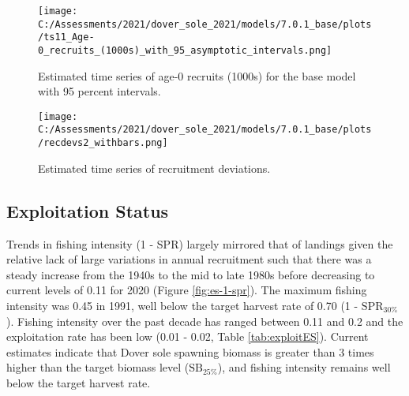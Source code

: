\documentclass[11pt,
  english,
  a4paper,
]{article}
\begin{document}
\leavevmode\tagmcend\tagstructend\par




\begin{figure}
\centering
\texttt{[image: C:/Assessments/2021/dover\_sole\_2021/models/7.0.1\_base/plots/ts11\_Age-0\_recruits\_(1000s)\_with\_95\_asymptotic\_intervals.png]}
\caption{Estimated time series of age-0 recruits (1000s) for the base model with 95 percent intervals.\label{fig:es-recruits}}
\end{figure}

\tagmcend\tagstructend


\begin{figure}
\centering
\texttt{[image: C:/Assessments/2021/dover\_sole\_2021/models/7.0.1\_base/plots/recdevs2\_withbars.png]}
\caption{Estimated time series of recruitment deviations.\label{fig:es-rec-devs}}
\end{figure}

\tagmcend\tagstructend

\clearpage


\hypertarget{exploitation-status}{%
\subsection*{Exploitation Status}\label{exploitation-status}}

\leavevmode\tagmcend\tagstructend


Trends in fishing intensity (1 - SPR) largely mirrored that of landings given the relative lack of large variations in annual recruitment such that there was a steady increase from the 1940s to the mid to late 1980s before decreasing to current levels of 0.11 for 2020 (Figure \ref{fig:es-1-spr}). The maximum fishing intensity was 0.45 in 1991, well below the target harvest rate of 0.70 (1 - {\(\text{SPR}_{30\%}\)\leavevmode\tagmcend\tagstructend}). Fishing intensity over the past decade has ranged between 0.11 and 0.2 and the exploitation rate has been low (0.01 - 0.02, Table \ref{tab:exploitES}). Current estimates indicate that Dover sole spawning biomass is greater than 3 times higher than the target biomass level ({\(\text{SB}_{25\%}\)\leavevmode\tagmcend\tagstructend}), and fishing intensity remains well below the target harvest rate.
\end{document}
